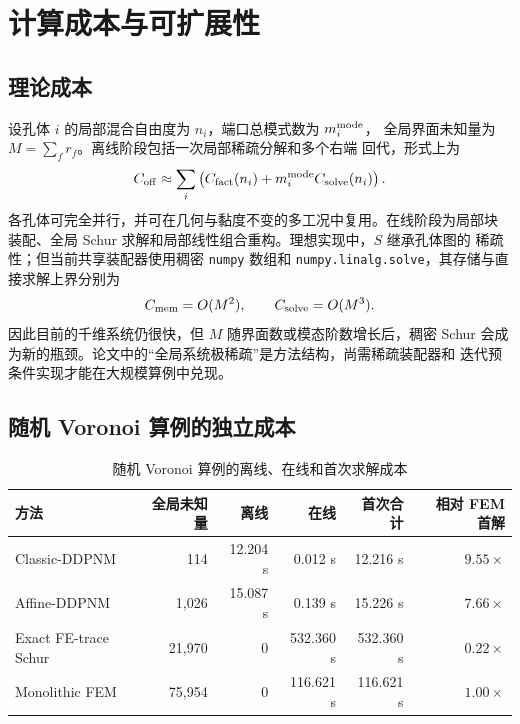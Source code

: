 \documentclass[UTF8,zihao=-4]{ctexart}
\begin{document}
\section{计算成本与可扩展性}

\subsection{理论成本}

设孔体 $i$ 的局部混合自由度为 $n_i$，端口总模式数为 $m_i^{\rm mode}$，
全局界面未知量为 $M=\sum_fr_f$。离线阶段包括一次局部稀疏分解和多个右端
回代，形式上为
\begin{equation}
  C_{\rm off}\approx\sum_i
  \left(C_{\rm fact}(n_i)+m_i^{\rm mode}C_{\rm solve}(n_i)\right).
\end{equation}
各孔体可完全并行，并可在几何与黏度不变的多工况中复用。在线阶段为局部块
装配、全局 Schur 求解和局部线性组合重构。理想实现中，$S$ 继承孔体图的
稀疏性；但当前共享装配器使用稠密 \texttt{numpy} 数组和
\texttt{numpy.linalg.solve}，其存储与直接求解上界分别为
\begin{equation}
  C_{\rm mem}=O(M^2),\qquad C_{\rm solve}=O(M^3).
\end{equation}
因此目前的千维系统仍很快，但 $M$ 随界面数或模态阶数增长后，稠密 Schur
会成为新的瓶颈。论文中的``全局系统极稀疏''是方法结构，尚需稀疏装配器和
迭代预条件实现才能在大规模算例中兑现。

\subsection{随机 Voronoi 算例的独立成本}

\begin{table}[htbp]
\centering
\caption{随机 Voronoi 算例的离线、在线和首次求解成本}
\label{tab:cost-voronoi}
\small
\begin{tabular}{lrrrrr}
\toprule
方法 & 全局未知量 & 离线 & 在线 & 首次合计 & 相对 FEM 首解\\
\midrule
Classic-DDPNM & 114 & 12.204 s & 0.012 s & 12.216 s & $9.55\times$\\
Affine-DDPNM & 1,026 & 15.087 s & 0.139 s & 15.226 s & $7.66\times$\\
Exact FE-trace Schur & 21,970 & 0 & 532.360 s & 532.360 s & $0.22\times$\\
Monolithic FEM & 75,954 & 0 & 116.621 s & 116.621 s & $1.00\times$\\
\bottomrule
\end{tabular}
\end{table}
\end{document}

